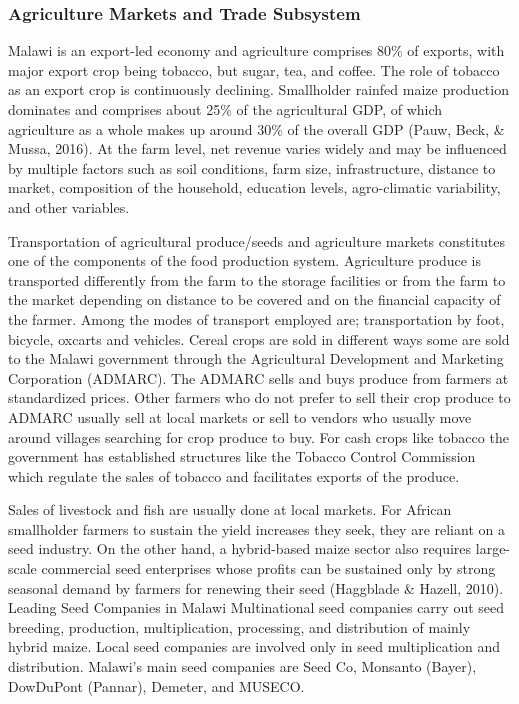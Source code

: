 \documentclass[
]{book}
\begin{document}
\hypertarget{agriculture-markets-and-trade-subsystem}{%
\subsubsection{Agriculture Markets and Trade Subsystem}\label{agriculture-markets-and-trade-subsystem}}

Malawi is an export-led economy and agriculture comprises 80\% of exports, with major export crop being tobacco, but sugar, tea, and coffee. The role of tobacco
as an export crop is continuously declining. Smallholder rainfed maize production dominates and comprises about 25\% of the agricultural GDP, of which agriculture
as a whole makes up around 30\% of the overall GDP (Pauw, Beck, \& Mussa, 2016). At the farm level, net revenue varies widely and may be influenced by multiple
factors such as soil conditions, farm size, infrastructure, distance to market, composition of the household, education levels, agro-climatic variability, and
other variables.

Transportation of agricultural produce/seeds and agriculture markets constitutes one of the components of the food production system. Agriculture produce is
transported differently from the farm to the storage facilities or from the farm to the market depending on distance to be covered and on the financial capacity
of the farmer. Among the modes of transport employed are; transportation by foot, bicycle, oxcarts and vehicles. Cereal crops are sold in different ways some are
sold to the Malawi government through the Agricultural Development and Marketing Corporation (ADMARC). The ADMARC sells and buys produce from farmers at
standardized prices. Other farmers who do not prefer to sell their crop produce to ADMARC usually sell at local markets or sell to vendors who usually move
around villages searching for crop produce to buy. For cash crops like tobacco the government has established structures like the Tobacco Control Commission
which regulate the sales of tobacco and facilitates exports of the produce.

Sales of livestock and fish are usually done at local markets. For African smallholder farmers to sustain the yield increases they seek, they are reliant on a
seed industry. On the other hand, a hybrid-based maize sector also requires large-scale commercial seed enterprises whose profits can be sustained only by strong
seasonal demand by farmers for renewing their seed (Haggblade \& Hazell, 2010). Leading Seed Companies in Malawi Multinational seed companies carry out seed
breeding, production, multiplication, processing, and distribution of mainly hybrid maize. Local seed companies are involved only in seed multiplication and
distribution. Malawi's main seed companies are Seed Co, Monsanto (Bayer), DowDuPont (Pannar), Demeter, and MUSECO.
\end{document}

